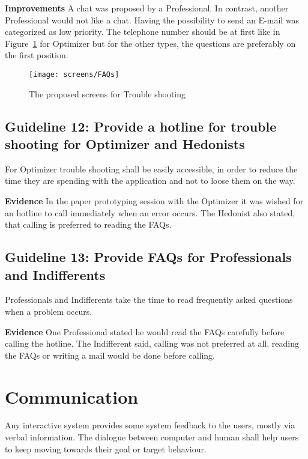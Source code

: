 \textbf{Improvements} \quad A chat was proposed by a Professional. In contrast, another Professional would not like a chat. Having the possibility to send an E-mail was categorized as low priority. The telephone number should be at first like in Figure~\ref{fig:trouble} for Optimizer but for the other types, the questions are preferably on the first position.

\begin{figure}[h]
	\centering
	\texttt{[image: screens/FAQs]}
	\caption{The proposed screens for Trouble shooting}
	\label{fig:trouble} %
\end{figure}

\subsection*{Guideline 12: Provide a hotline for trouble shooting for Optimizer and Hedonists}
For Optimizer trouble shooting shall be easily accessible, in order to reduce the time they are spending with the application and not to loose them on the way.

\textbf{Evidence} \quad In the paper prototyping session with the Optimizer it was wished for an hotline to call immediately when an error occurs. The Hedonist also stated, that calling is preferred to reading the FAQs.


\subsection*{Guideline 13: Provide FAQs for Professionals and Indifferents}

Professionals and Indifferents take the time to read frequently asked questions when a problem occurs. 

\textbf{Evidence} \quad One Professional stated he would read the FAQs carefully before calling the hotline. The Indifferent said, calling was not preferred at all, reading the FAQs or writing a mail would be done before calling.

\section{Communication}

Any interactive system provides some system feedback to the users, mostly via verbal information. The dialogue between computer and human shall help users to keep moving towards their goal or target behaviour.

